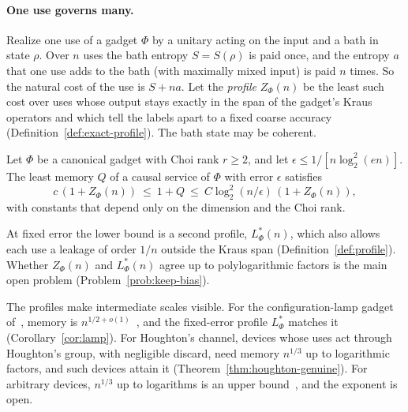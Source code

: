 \paragraph{One use governs many.}
Realize one use of a gadget $\Phi$ by a unitary acting on the input and a
bath in state $\rho$. Over $n$ uses the bath entropy $S=S(\rho)$ is paid
once, and the entropy $a$ that one use adds to the bath (with maximally
mixed input) is paid $n$ times. So the natural cost of the use is
$S+na$. Let the \emph{profile} $Z_\Phi(n)$ be the least such cost over
uses whose output stays exactly in the span of the gadget's Kraus
operators and which tell the labels apart to a fixed coarse accuracy
(Definition~\ref{def:exact-profile}). The bath state may be coherent.

\begin{introthm}\label{thm:intro-memory}
Let $\Phi$ be a canonical gadget with Choi rank $r\geq2$, and let
$\epsilon\leq1/[n\log_2^2(en)]$. The least memory $Q$ of a causal service
of $\Phi$ with error $\epsilon$ satisfies
\[
 c\,(1+Z_\Phi(n))\ \leq\ 1+Q\ \leq\ C\log_2^2(n/\epsilon)\,(1+Z_\Phi(n)),
\]
with constants that depend only on the dimension and the Choi rank.
\end{introthm}

At fixed error the lower bound is a second profile, $L^*_\Phi(n)$, which
also allows each use a leakage of order $1/n$ outside the Kraus span
(Definition~\ref{def:profile}). Whether $Z_\Phi(n)$ and $L^*_\Phi(n)$
agree up to polylogarithmic factors is the main open problem
(Problem~\ref{prob:keep-bias}).

The profiles make intermediate scales visible. For the configuration-lamp
gadget of~\cite[Section~11]{DouglasMghirbiC}, memory is
$n^{1/2+o(1)}$~\cite[Theorem~11.1(b)]{DouglasMghirbiC}, and the
fixed-error profile $L^*_\Phi$ matches it (Corollary~\ref{cor:lamp}).
For Houghton's channel, devices whose uses act through Houghton's group,
with negligible discard, need memory $n^{1/3}$ up to logarithmic
factors, and such devices attain it
(Theorem~\ref{thm:houghton-genuine}). For arbitrary devices, $n^{1/3}$
up to logarithms is an upper bound~\cite[Corollary~6.7]{DouglasMghirbiB},
and the exponent is open.

